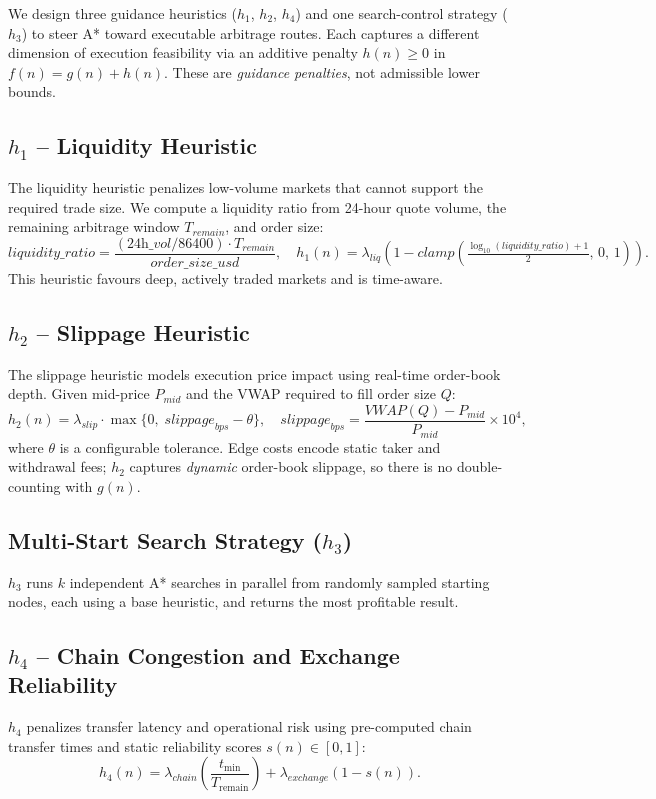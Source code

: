 We design three guidance heuristics ($h_1$, $h_2$, $h_4$) and one search-control strategy ($h_3$) to steer A* toward executable arbitrage routes. Each captures a different dimension of execution feasibility via an additive penalty $h(n) \geq 0$ in $f(n) = g(n) + h(n)$. These are \emph{guidance penalties}, not admissible lower bounds.

\subsection{$h_1$ -- Liquidity Heuristic}

The liquidity heuristic penalizes low-volume markets that cannot support the required trade size. We compute a liquidity ratio from 24-hour quote volume, the remaining arbitrage window $T_{\textit{remain}}$, and order size:
\[
\textit{liquidity\_ratio} = \frac{(\textit{24h\_vol} / 86400) \cdot T_{\textit{remain}}}{\textit{order\_size\_usd}},
\quad
h_1(n) = \lambda_{liq}\!\left(1 - \textit{clamp}\!\left(\tfrac{\log_{10}(\textit{liquidity\_ratio})+1}{2},\,0,\,1\right)\right).
\]
This heuristic favours deep, actively traded markets and is time-aware.

\subsection{$h_2$ -- Slippage Heuristic}

The slippage heuristic models execution price impact using real-time order-book depth. Given mid-price $P_{mid}$ and the VWAP required to fill order size $Q$:
\[
h_2(n) = \lambda_{slip} \cdot \max\!\bigl\{0,\; \textit{slippage}_{bps} - \theta\bigr\},
\quad
\textit{slippage}_{bps} = \frac{\textit{VWAP}(Q) - P_{mid}}{P_{mid}} \times 10^4,
\]
where $\theta$ is a configurable tolerance. Edge costs encode static taker and withdrawal fees; $h_2$ captures \emph{dynamic} order-book slippage, so there is no double-counting with $g(n)$.

\subsection{Multi-Start Search Strategy ($h_3$)}

$h_3$ runs $k$ independent A* searches in parallel from randomly sampled starting nodes, each using a base heuristic, and returns the most profitable result.

\subsection{$h_4$ -- Chain Congestion and Exchange Reliability}

$h_4$ penalizes transfer latency and operational risk using pre-computed chain transfer times and static reliability scores $s(n) \in [0,1]$:
\[
h_4(n) = \lambda_{chain}\!\left(\frac{t_{\min}}{T_{\text{remain}}}\right) + \lambda_{exchange}\!\left(1 - s(n)\right).
\]
